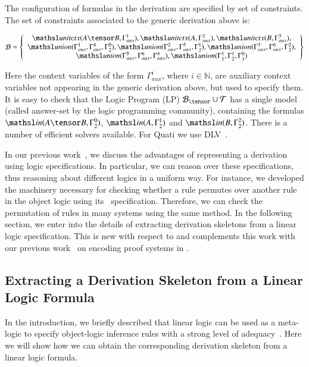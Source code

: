 \documentclass[a4paper,10pt]{article}
\newcommand{\elin}[2]{\ensuremath{{\tsl{unitctx}(\ensuremath{#1}, \ensuremath{#2})}}}
\newcommand{\union}[3]{\ensuremath{{\tsl{union}(\ensuremath{#1},\ensuremath{#2},\ensuremath{ #3})}}}
\newcommand{\In}[2]{\ensuremath{\tsl{in}(\ensuremath{#1},\ensuremath{#2})}}
\begin{document}
The configuration of formulas in the derivation are specified by set of constraints.
The set of constraints associated to the generic derivation above is:
\begin{small}
\[
\Bscr = \left\{
\begin{array}{c}
\elin{A \tensor B}{\Gamma_{aux}^1},
\elin{A}{\Gamma_{aux}^2},
\elin{B}{\Gamma_{aux}^3}, \\
\union{\Gamma_{aux}^1}{\Gamma_{aux}^4}{\Gamma^{0}_{2}},
\union{\Gamma_{aux}^2}{\Gamma_{aux}^5}{\Gamma^{1}_{2}}, 
\union{\Gamma_{aux}^3}{\Gamma_{aux}^6}{\Gamma^{2}_{2}},\\
\union{\Gamma_{aux}^5}{\Gamma_{aux}^6}{\Gamma_{aux}^4},
\union{\Gamma^1_1}{\Gamma^1_2}{\Gamma^0_1}
\end{array}
\right\}
\]
\end{small}%
Here the context variables of the form $\Gamma_{aux}^i$, where $i \in \mathbb{N}$, are 
auxiliary context variables not appearing in the generic derivation above, 
but used to specify them. It is easy to check that the Logic Program (LP) $\Bscr_\tensor \cup \Tscr$
has a single model (called answer-set by the logic programming community), 
containing the formulas $\In{A \tensor B}{\Gamma^{0}_{2}}$,
$\In{A}{\Gamma^{1}_{2}}$ and $\In{B}{\Gamma^{2}_{2}}$. There is a number of efficient 
solvers available. For Quati we use DLV~\cite{dlv}.

In our previous work~\cite{nigam13iclp}, we discuss the advantages of representing 
a derivation using logic specifications. In particular, we can reason over
these specifications, thus reasoning about different logics in a uniform way.
For instance, we developed the machinery necessary for checking whether a rule
permutes over another rule in the object logic using its \sell\ specification.
Therefore, we can check the permutation of rules in many systems using the same
method.
In the following section, we enter into the details of extracting derivation skeletons
from a linear logic specification. This is new with respect to \cite{nigam13iclp} and 
complements this work with our previous work~\cite{nigam.jlc} on encoding proof
systems in \sell. 

\subsection{Extracting a Derivation Skeleton from a Linear Logic Formula}
\label{sec:extract}

In the introduction, we briefly described that linear logic can be used as a meta-logic 
to specify object-logic inference rules with a strong level of 
adequacy~\cite{nigam10jar}. Here we will show how we can obtain the corresponding
derivation skeleton from a linear logic formula. 
\end{document}
